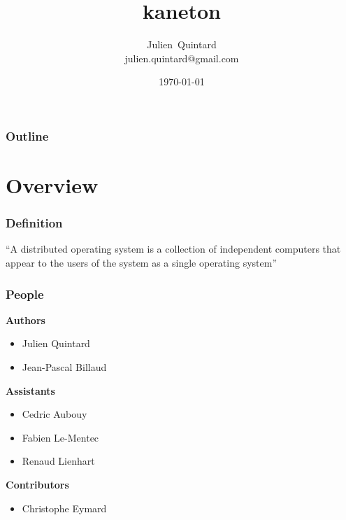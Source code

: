 \documentclass[8pt]{beamer}
\title{kaneton}
\author
{
  Julien~Quintard\inst{1} \\
  {\tiny julien.quintard@gmail.com}
}
\institute
{
  \inst{1} kaneton distributed operating system project
}
\date{\today}
\newcommand{\nl}[0]{\vspace{0.4cm}}
\begin{document}
%
%

\begin{frame}
  \titlepage

  \begin{center}
     \hspace{0.1cm}  \hspace{0.1cm}
     \hspace{0.1cm}
  \end{center}
\end{frame}

%
%

\begin{frame}
  \frametitle{Outline}
  \tableofcontents
\end{frame}

%
%

\section{Overview}


\begin{frame}
  \frametitle{Definition}

  ``A distributed operating system is a collection of independent
  computers that appear to the users of the system as a single operating
  system''
\end{frame}


\begin{frame}
  \frametitle{People}

  \textbf{Authors}

  \begin{itemize}
    \item
      Julien Quintard
    \item
      Jean-Pascal Billaud
  \end{itemize}

  \nl

  \textbf{Assistants}

  \begin{itemize}
    \item
      Cedric Aubouy
    \item
      Fabien Le-Mentec
    \item
      Renaud Lienhart
  \end{itemize}

  \nl

  \textbf{Contributors}

  \begin{itemize}
    \item
      Christophe Eymard
  \end{itemize}
\end{frame}
\end{document}
